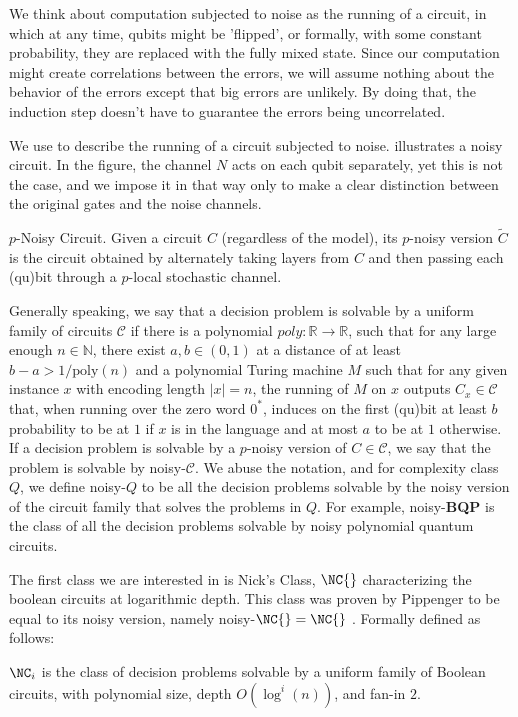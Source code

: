 We think about computation subjected to noise as the running of a circuit, in which at any time, qubits might be 'flipped', or formally, with some constant probability, they are replaced with the fully mixed state. Since our computation might create correlations between the errors, we will assume nothing about the behavior of the errors except that big errors are unlikely. By doing that, the induction step doesn't have to guarantee the errors being uncorrelated. 

We use  to describe the running of a circuit subjected to noise.  illustrates a noisy circuit. In the figure, the channel $N$ acts on each qubit separately, yet this is not the case, and we impose it in that way only to make a clear distinction between the original gates and the noise channels. \begin{definition}{$p$-Noisy Circuit.}
    \label{def:pnoise}
    Given a circuit $C$ (regardless of the model), its $p$-noisy version $\tilde{C}$ is the circuit obtained by alternately taking layers from $C$ and then passing each (qu)bit through a $p$-local stochastic channel.
  \end{definition}

  
  Generally speaking, we say that a decision problem is solvable by a uniform family of circuits $\mathcal{C}$ if there is a polynomial $poly : \mathbb{R} \rightarrow \mathbb{R}$, such that for any large enough $n \in \mathbb{N}$, there exist $a, b \in (0,1)$ at a distance of at least $b - a > 1/\text{poly}(n)$ and a polynomial Turing machine $M$ such that for any given instance $x$ with encoding length $|x| = n$, the running of $M$ on $x$ outputs $C_x \in \mathcal{C}$ that, when running over the zero word $0^{*}$, induces on the first (qu)bit at least $b$ probability to be at $1$ if $x$ is in the language and at most $a$ to be at $1$ otherwise. 
If a decision problem is solvable by a $p$-noisy version of $C \in \mathcal{C}$, we say that the problem is solvable by noisy-$\mathcal{C}$. We abuse the notation, and for complexity class $Q$, we define noisy-$Q$ to be all the decision problems solvable by the noisy version of the circuit family that solves the problems in $Q$. For example, noisy-\textbf{BQP} is the class of all the decision problems solvable by noisy polynomial quantum circuits.  


The first class we are interested in is Nick's Class, $\NC{}$  characterizing the boolean circuits at logarithmic depth. This class was proven by Pippenger to be equal to its noisy version, namely noisy-$\NC{} = \NC{}$ \cite{Pippenger}. Formally defined as follows: 
\begin{definition}
$\NC_i$ is the class of decision problems solvable by a uniform family of Boolean circuits, with polynomial size, depth $O(\log^i(n))$, and fan-in $2$. 
\end{definition}


